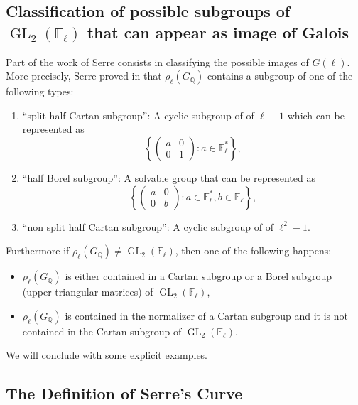 \documentclass[a4paper,10pt]{article}
\newcommand{\F}{\mathbb{F}}
\newcommand{\Q}{\mathbb{Q}}
\begin{document}
\subsection{Classification of possible subgroups of $\operatorname{GL}_2(\F_\ell)$ that can appear as image of Galois}
Part of the work of Serre consists in classifying the possible images of $G(\ell)$. More precisely, Serre proved in \cite{S2} 
that $\rho_\ell(G_\Q)$ contains a subgroup of one of the 
following types:
\begin{enumerate}
 \item ``split half Cartan subgroup'': A cyclic subgroup of of $\ell-1$ which can be represented as
 $$\left\{\begin{pmatrix} a&0\\ 0&1            
           \end{pmatrix}: a\in\F_\ell^*\right\},$$
 \item ``half Borel subgroup'': A solvable group that can be represented as
 $$\left\{\begin{pmatrix} a&0\\ 0&b            
           \end{pmatrix}: a\in\F_\ell^*, b\in\F_\ell\right\},$$ 
 \item ``non split half Cartan subgroup'': A cyclic subgroup of of $\ell^2-1$.
\end{enumerate}
Furthermore if $\rho_\ell(G_\Q)\neq\operatorname{GL}_2(\F_\ell)$, then one of the following happens:

\begin{itemize}
 \item $\rho_\ell(G_\Q)$ is either contained in a Cartan subgroup or a Borel subgroup (upper
triangular matrices) of $\operatorname{GL}_2(\F_\ell)$,
 \item $\rho_\ell(G_\Q)$ is contained in the normalizer of a Cartan subgroup and it is not contained in the Cartan subgroup
 of $\operatorname{GL}_2(\F_\ell)$.
\end{itemize}
We will conclude with some explicit examples.
\subsection{The Definition of Serre's Curve}
\end{document}
